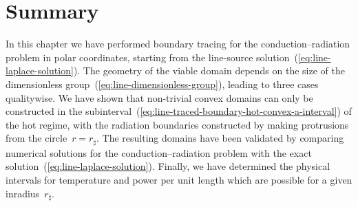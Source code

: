 \section{Summary}
\label{sec:polar.summary}

In this chapter we have performed boundary tracing
for the conduction--radiation problem in polar coordinates,
starting from the line-source solution~(\ref{eq:line-laplace-solution}).
The geometry of the viable domain depends on the size
of the dimensionless group~(\ref{eq:line-dimensionless-group}),
leading to three cases qualitywise.
We have shown that non-trivial convex domains can only be constructed
in the subinterval~(\ref{eq:line-traced-boundary-hot-convex-a-interval})
of the hot regime,
with the radiation boundaries constructed by
making protrusions from the circle~$r = r_\sharp$.
The resulting domains have been validated
by comparing numerical solutions for the conduction--radiation problem
with the exact solution~(\ref{eq:line-laplace-solution}).
Finally, we have determined the physical intervals
for temperature and power per unit length
which are possible for a given inradius~$r_\sharp$.
